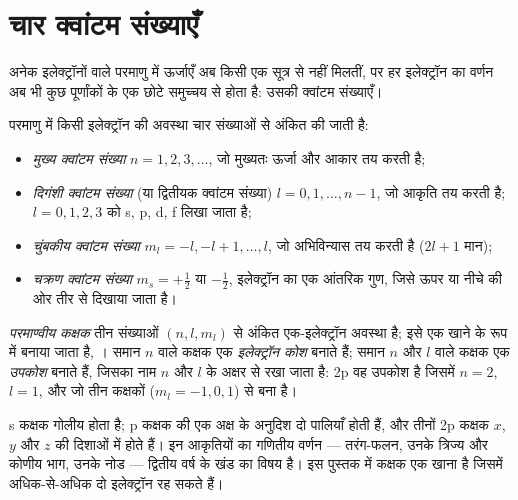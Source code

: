 \section{चार क्वांटम संख्याएँ}

अनेक इलेक्ट्रॉनों वाले परमाणु में ऊर्जाएँ अब किसी एक सूत्र से नहीं मिलतीं,
पर हर इलेक्ट्रॉन का वर्णन अब भी कुछ पूर्णांकों के एक छोटे समुच्चय से होता है:
उसकी क्वांटम संख्याएँ।

\begin{definition}[क्वांटम संख्याएँ]\label{def:b1:quantum-numbers:quantum-number}
परमाणु में किसी इलेक्ट्रॉन की अवस्था चार संख्याओं से अंकित की जाती है:
\begin{itemize}
  \item \emph{मुख्य क्वांटम संख्या}
        $n = 1, 2, 3, \dots$, जो मुख्यतः ऊर्जा और आकार तय करती है;
  \item \emph{दिगंशी क्वांटम संख्या}
        (या द्वितीयक क्वांटम संख्या) $l = 0, 1, \dots, n-1$, जो आकृति
        तय करती है; $l = 0, 1, 2, 3$ को s, p, d, f लिखा जाता है;
  \item \emph{चुंबकीय क्वांटम संख्या}
        $m_l = -l, -l+1, \dots, l$, जो अभिविन्यास तय करती है ($2l + 1$
        मान);
  \item \emph{चक्रण क्वांटम संख्या}
        $m_s = +\tfrac12$ या $-\tfrac12$, इलेक्ट्रॉन का एक आंतरिक गुण, जिसे
        ऊपर या नीचे की ओर तीर से दिखाया जाता है।
\end{itemize}
\end{definition}

\begin{definition}\label{def:b1:quantum-numbers:orbital}
\emph{परमाण्वीय कक्षक} तीन संख्याओं $(n, l, m_l)$
से अंकित एक-इलेक्ट्रॉन अवस्था है; इसे एक खाने के रूप में बनाया जाता है,
\omorbs{}। समान $n$ वाले कक्षक एक \emph{इलेक्ट्रॉन
कोश} बनाते हैं; समान $n$ और $l$ वाले कक्षक एक
\emph{उपकोश} बनाते हैं, जिसका नाम $n$ और $l$ के अक्षर से रखा जाता है:
2p वह उपकोश है जिसमें $n = 2$, $l = 1$, और जो तीन कक्षकों
($m_l = -1, 0, 1$) से बना है।
\end{definition}

\begin{remark}[आकृतियाँ]\label{rem:b1:quantum-numbers:shapes}
s कक्षक गोलीय होता है; p कक्षक की एक अक्ष के अनुदिश दो पालियाँ होती हैं, और
तीनों 2p कक्षक $x$, $y$ और $z$ की दिशाओं में होते हैं। इन आकृतियों का
गणितीय वर्णन --- तरंग-फलन, उनके त्रिज्य और कोणीय भाग, उनके
नोड --- द्वितीय वर्ष के खंड का विषय है। इस पुस्तक में
कक्षक एक खाना है जिसमें अधिक-से-अधिक दो इलेक्ट्रॉन रह सकते हैं।
\end{remark}


